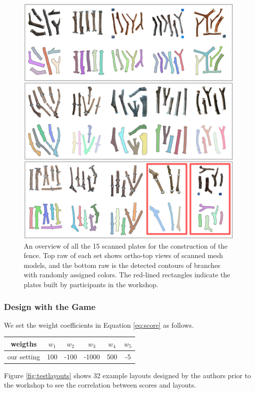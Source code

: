 \begin{figure}[ht]
  \begin{center}
    \includegraphics[width = 0.4\paperwidth]{images/fabrication/all_plates.png}
    \caption{An overview of all the 15 scanned plates for the construction of the fence. Top raw of each set shows ortho-top views of scanned mesh models, and the bottom raw is the detected contours of branches with randomly assigned colors. The red-lined rectangles indicate the plates built by participants in the workshop.}
    \label{fig:scannedplates}
  \end{center}
\end{figure}


\subsubsection*{Design with the Game}

We set the weight coefficients in Equation \ref{eq:score} as follows.
\begin{center}
	\begin{tabulary}{\columnwidth}{ |C||C|C|C|C|C| }
		\hline
		weigths & $w_1$ & $w_2$ & $w_3$ & $w_4$ & $w_5$ \\
		\hline
		our setting & 100 & -100 & -1000 & 500 & -5 \\
		\hline
	\end{tabulary}
	\label{tab:weights}
\end{center}
Figure \ref{fig:testlayouts} shows 32 example layouts designed by the authors prior to the workshop to see the correlation between scores and layouts.

